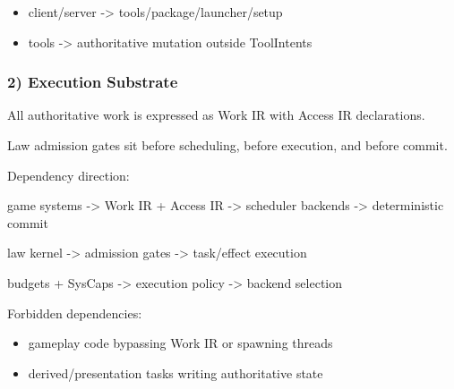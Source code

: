 \documentclass[9pt,a4paper,openany]{book}
\begin{document}
\begin{itemize}
\item client/\allowbreak{}server -\allowbreak{}> tools/\allowbreak{}package/\allowbreak{}launcher/\allowbreak{}setup
\end{itemize}


\begin{itemize}
\item tools -\allowbreak{}> authoritative mutation outside ToolIntents
\end{itemize}





\subsubsection{2) Execution Substrate}


All authoritative work is expressed as Work IR with Access IR declarations.\allowbreak{}



Law admission gates sit before scheduling, before execution, and before commit.\allowbreak{}






Dependency direction:



game systems -\allowbreak{}> Work IR + Access IR -\allowbreak{}> scheduler backends -\allowbreak{}> deterministic commit



law kernel -\allowbreak{}> admission gates -\allowbreak{}> task/\allowbreak{}effect execution



budgets + SysCaps -\allowbreak{}> execution policy -\allowbreak{}> backend selection






Forbidden dependencies:



\begin{itemize}
\item gameplay code bypassing Work IR or spawning threads
\end{itemize}


\begin{itemize}
\item derived/\allowbreak{}presentation tasks writing authoritative state
\end{itemize}
\end{document}
